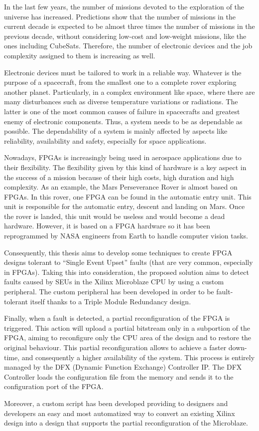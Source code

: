 In the last few years, the number of missions devoted to the exploration of the universe has increased. Predictions show that the number of missions in the current decade is expected to be almost three times the number of missions in the previous decade, without considering low-cost and low-weight missions, like the ones including CubeSats. Therefore, the number of electronic devices and the job complexity assigned to them is increasing as well.\bigskip

Electronic devices must be tailored to work in a reliable way. Whatever  is the purpose of a spacecraft, from the smallest one to a complete rover exploring another planet. Particularly, in a complex environment like space, where there are many disturbances such as diverse temperature variations or radiations. The latter is one of the most common causes of failure in spacecrafts and greatest enemy of electronic components. Thus, a system needs to be as dependable as possible. The dependability of a system is mainly affected by aspects like reliability, availability and safety, especially for space applications.\bigskip

Nowadays, FPGAs is increasingly being used in aerospace applications due to their flexibility. The flexibility given by this kind of hardware is a key aspect in the success of a mission because of their high costs, high duration and high complexity. As an example, the Mars Perseverance Rover is almost based on FPGAs. In this rover, one FPGA can be found in the automatic entry unit. This unit is responsible for the automatic entry, descent and landing on Mars. Once the rover is landed, this unit would be useless and would become a dead hardware. However, it is based on a FPGA hardware so it has been reprogrammed by NASA engineers from Earth to handle computer vision tasks. \bigskip

Consequently, this thesis aims to develop some techniques to create FPGA designs tolerant to “Single Event Upset” faults (that are very common, especially in FPGAs). Taking this into consideration, the proposed solution aims to detect faults caused by SEUs in the Xilinx Microblaze CPU by using a custom peripheral. The custom peripheral has been developed in order to be fault-tolerant itself thanks to a Triple Module Redundancy design.\bigskip

Finally, when a fault is detected, a partial reconfiguration of the FPGA is triggered. This action will upload a partial bitstream only in a subportion of the FPGA, aiming to reconfigure only the CPU area of the design and to restore the original behaviour. This partial reconfiguration allows to achieve a faster down-time, and consequently a higher availability of the system. This process is entirely managed by the DFX (Dynamic Function Exchange) Controller IP. The DFX Controller loads the configuration file from the memory and sends it to the configuration port of the FPGA. \bigskip

Moreover, a custom script has been developed providing to designers and developers an easy and most automatized way to convert an existing Xilinx design into a design that supports the partial reconfiguration of the Microblaze.\bigskip

